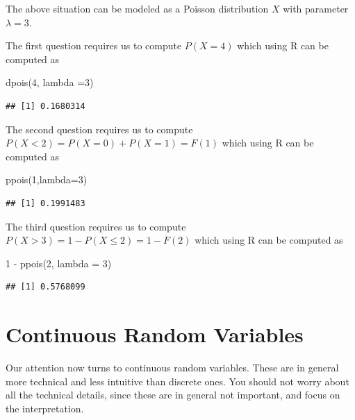 \documentclass[
]{book}
\newenvironment{Shaded}{\begin{snugshade}}{\end{snugshade}}
\newcommand{\AttributeTok}[1]{\textcolor[rgb]{0.77,0.63,0.00}{#1}}
\newcommand{\DecValTok}[1]{\textcolor[rgb]{0.00,0.00,0.81}{#1}}
\newcommand{\FunctionTok}[1]{\textcolor[rgb]{0.00,0.00,0.00}{#1}}
\newcommand{\NormalTok}[1]{#1}
\newcommand{\SpecialCharTok}[1]{\textcolor[rgb]{0.00,0.00,0.00}{#1}}
\theoremstyle{definition}
\theoremstyle{definition}
\theoremstyle{definition}
\theoremstyle{definition}
\theoremstyle{remark}
\begin{document}
The above situation can be modeled as a Poisson distribution \(X\) with parameter \(\lambda = 3\).

The first question requires us to compute \(P(X=4)\) which using R can be computed as

\begin{Shaded}
\begin{Highlighting}[]
\FunctionTok{dpois}\NormalTok{(}\DecValTok{4}\NormalTok{, }\AttributeTok{lambda =}\DecValTok{3}\NormalTok{)}
\end{Highlighting}
\end{Shaded}

\begin{verbatim}
## [1] 0.1680314
\end{verbatim}

The second question requires us to compute \(P(X<2) = P(X=0)+P(X=1)= F(1)\) which using R can be computed as

\begin{Shaded}
\begin{Highlighting}[]
\FunctionTok{ppois}\NormalTok{(}\DecValTok{1}\NormalTok{,}\AttributeTok{lambda=}\DecValTok{3}\NormalTok{)}
\end{Highlighting}
\end{Shaded}

\begin{verbatim}
## [1] 0.1991483
\end{verbatim}

The third question requires us to compute \(P(X>3) = 1 - P(X\leq 2) = 1 - F(2)\) which using R can be computed as

\begin{Shaded}
\begin{Highlighting}[]
\DecValTok{1} \SpecialCharTok{{-}} \FunctionTok{ppois}\NormalTok{(}\DecValTok{2}\NormalTok{, }\AttributeTok{lambda =} \DecValTok{3}\NormalTok{)}
\end{Highlighting}
\end{Shaded}

\begin{verbatim}
## [1] 0.5768099
\end{verbatim}

\hypertarget{continuous-random-variables-1}{%
\section{Continuous Random Variables}\label{continuous-random-variables-1}}

Our attention now turns to continuous random variables. These are in general more technical and less intuitive than discrete ones. You should not worry about all the technical details, since these are in general not important, and focus on the interpretation.
\end{document}
